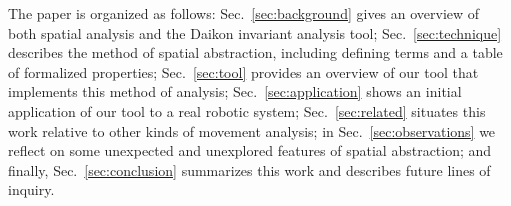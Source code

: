 The paper is organized as follows:
Sec.~\ref{sec:background} gives an overview of both spatial analysis and the Daikon invariant analysis tool;
Sec.~\ref{sec:technique} describes the method of spatial abstraction, including defining terms and a table of formalized properties;
Sec.~\ref{sec:tool} provides an overview of our tool that implements this method of analysis;
Sec.~\ref{sec:application} shows an initial application of our tool to a real robotic system;
Sec.~\ref{sec:related} situates this work relative to other kinds of movement analysis;
in Sec.~\ref{sec:observations} we reflect on some unexpected and unexplored features of spatial abstraction;
and finally, Sec.~\ref{sec:conclusion} summarizes this work and describes future lines of inquiry. 




